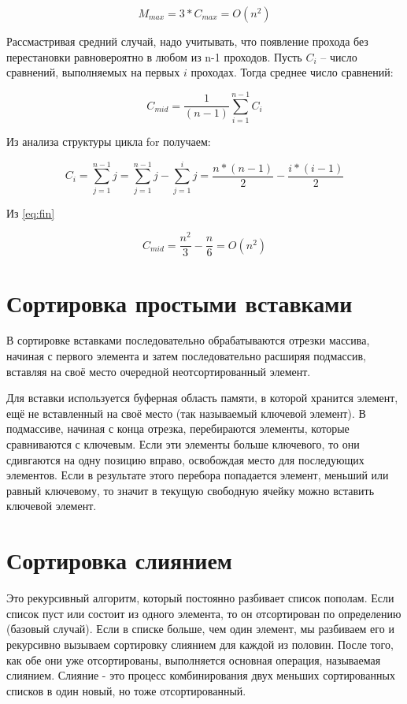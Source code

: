 \begin{equation}
    M_{max} = 3*C_{max} = O(n^2)
\end{equation}

Рассмастривая средний случай, надо учитывать, что появление прохода без перестановки равновероятно в любом из n-1 проходов. Пусть $C_i$ -- число сравнений, выполняемых на первых $i$ проходах. Тогда среднее число сравнений:

\begin{equation}
    C_{mid} = \frac{1}{(n-1)} \sum_{i=1}^{n-1} C_i
\end{equation}

Из анализа структуры цикла for получаем:

\begin{equation}
    C_i = \sum_{j=1}^{n-1} j = \sum_{j=1}^{n-1} j - \sum_{j=1}^{i} j = \frac{n*(n-1)}{2} - \frac{i*(i-1)}{2}
\label{eq:fin}
\end{equation}

Из \ref{eq:fin}

\begin{equation}
    C_{mid} = \frac{n^2}{3} - \frac{n}{6} = O(n^2)
\end{equation}

\section{ Сортировка простыми вставками}
В сортировке вставками последовательно обрабатываются отрезки массива, начиная с первого элемента и затем последовательно расширяя подмассив, вставляя на своё место очередной неотсортированный элемент.

Для вставки используется буферная область памяти, в которой хранится элемент, ещё не вставленный на своё место (так называемый ключевой элемент). В подмассиве, начиная с конца отрезка, перебираются элементы, которые сравниваются с ключевым. Если эти элементы больше ключевого, то они сдивгаются на одну позицию вправо, освобождая место для последующих элементов. Если в результате этого перебора попадается элемент, меньший или равный ключевому, то значит в текущую свободную ячейку можно вставить ключевой элемент.

\section{ Сортировка слиянием}
Это рекурсивный алгоритм, который постоянно разбивает список пополам. Если список пуст или состоит из одного элемента, то он отсортирован по определению (базовый случай). Если в списке больше, чем один элемент, мы разбиваем его и рекурсивно вызываем сортировку слиянием для каждой из половин. После того, как обе они уже отсортированы, выполняется основная операция, называемая слиянием. Слияние - это процесс комбинирования двух меньших сортированных списков в один новый, но тоже отсортированный.

